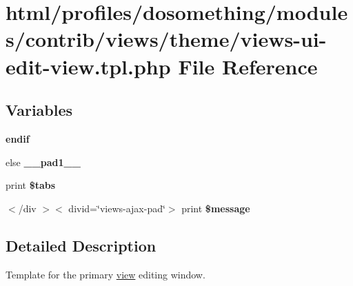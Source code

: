 \hypertarget{views-ui-edit-view_8tpl_8php}{
\section{html/profiles/dosomething/modules/contrib/views/theme/views-\/ui-\/edit-\/view.tpl.php File Reference}
\label{views-ui-edit-view_8tpl_8php}
}
\subsection*{Variables}
\begin{DoxyCompactItemize}
\item 
\hypertarget{views-ui-edit-view_8tpl_8php_a82cd33ca97ff99f2fcc5e9c81d65251b}{
{\bfseries endif}}
\label{views-ui-edit-view_8tpl_8php_a82cd33ca97ff99f2fcc5e9c81d65251b}

\item 
\hypertarget{views-ui-edit-view_8tpl_8php_ae8b4bb1441c6ab4dcb28a37bc46c8ead}{
else {\bfseries \_\-\_\-pad1\_\-\_\-}}
\label{views-ui-edit-view_8tpl_8php_ae8b4bb1441c6ab4dcb28a37bc46c8ead}

\item 
\hypertarget{views-ui-edit-view_8tpl_8php_a442ec3e86534b83e833f5a2a7110ece0}{
print {\bfseries \$tabs}}
\label{views-ui-edit-view_8tpl_8php_a442ec3e86534b83e833f5a2a7110ece0}

\item 
\hypertarget{views-ui-edit-view_8tpl_8php_ac78b116c9a3de39786b1a1c89a73ca8e}{
$<$/div $>$$<$ divid=\char`\"{}views-\/ajax-\/pad\char`\"{}$>$ print {\bfseries \$message}}
\label{views-ui-edit-view_8tpl_8php_ac78b116c9a3de39786b1a1c89a73ca8e}

\end{DoxyCompactItemize}


\subsection{Detailed Description}
Template for the primary \hyperlink{classview}{view} editing window. 